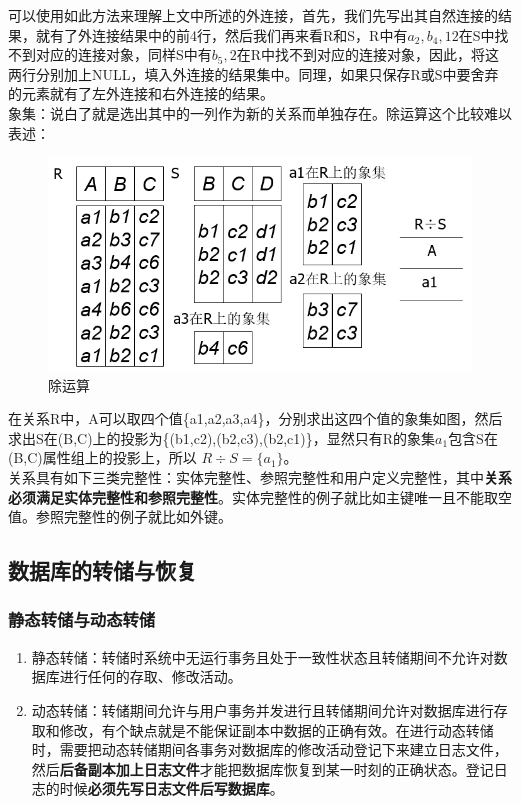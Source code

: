 \documentclass[chapter.computer_science.tex]{subfiles}
\begin{document}
可以使用如此方法来理解上文中所述的外连接，首先，我们先写出其自然连接的结果，就有了外连接结果中的前4行，然后我们再来看R和S，R中有$ a_2,b_4,12 $在S中找不到对应的连接对象，同样S中有$ b_5,2 $在R中找不到对应的连接对象，因此，将这两行分别加上NULL，填入外连接的结果集中。同理，如果只保存R或S中要舍弃的元素就有了左外连接和右外连接的结果。\\
象集：说白了就是选出其中的一列作为新的关系而单独存在。除运算这个比较难以表述：\\
\begin{figure}[H]
    \centering
    \includegraphics[scale=0.25]{./images/0031.png}
    \caption{除运算}
\end{figure}
在关系R中，A可以取四个值\{a1,a2,a3,a4\}，分别求出这四个值的象集如图，然后求出S在(B,C)上的投影为\{(b1,c2),(b2,c3),(b2,c1)\}，显然只有R的象集$ a_1 $包含S在(B,C)属性组上的投影上，所以 $ R \div S=\{a_1\} $。\\
关系具有如下三类完整性：实体完整性、参照完整性和用户定义完整性，其中{\bfseries 关系必须满足实体完整性和参照完整性}。实体完整性的例子就比如主键唯一且不能取空值。参照完整性的例子就比如外键。

\subsection{数据库的转储与恢复}
\subsubsection{静态转储与动态转储}
\begin{enumerate}
    \item 静态转储：转储时系统中无运行事务且处于一致性状态且转储期间不允许对数据库进行任何的存取、修改活动。
    \item 动态转储：转储期间允许与用户事务并发进行且转储期间允许对数据库进行存取和修改，有个缺点就是不能保证副本中数据的正确有效。在进行动态转储时，需要把动态转储期间各事务对数据库的修改活动登记下来建立日志文件，然后{\bfseries 后备副本加上日志文件}才能把数据库恢复到某一时刻的正确状态。登记日志的时候{\bfseries 必须先写日志文件后写数据库}。
\end{enumerate}
\end{document}
